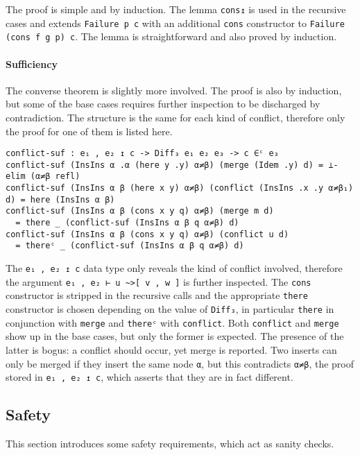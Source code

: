 \documentclass[../Thesis.tex]{subfiles}
\begin{document}
	The proof is simple and by induction. 
	The lemma \texttt{cons↥} is used in the
	recursive cases and extends \texttt{Failure p c} with an additional 
	\texttt{cons} constructor to \texttt{Failure (cons f g p) c}. The lemma
	is straightforward and also proved by induction.

	\paragraph{Sufficiency}
	The converse theorem is slightly more involved.
	The proof is also by induction, but some of the base cases requires further 
	inspection to be discharged by contradiction.
	The structure is the same for each kind of conflict, therefore only the
	proof for one of them is listed here.
	
\begin{verbatim}
conflict-suf : e₁ , e₂ ↥ c -> Diff₃ e₁ e₂ e₃ -> c ∈ᶜ e₃
conflict-suf (InsIns α .α (here y .y) α≠β) (merge (Idem .y) d) = ⊥-elim (α≠β refl)
conflict-suf (InsIns α β (here x y) α≠β) (conflict (InsIns .x .y α≠β₁) d) = here (InsIns α β)
conflict-suf (InsIns α β (cons x y q) α≠β) (merge m d) 
  = there _ (conflict-suf (InsIns α β q α≠β) d)
conflict-suf (InsIns α β (cons x y q) α≠β) (conflict u d) 
  = thereᶜ _ (conflict-suf (InsIns α β q α≠β) d)
\end{verbatim}

The \texttt{e₁ , e₂ ↥ c} data type only reveals the kind of conflict involved,
therefore the argument \texttt{e₁ , e₂ ⊢ u \textasciitilde>[ v , w ]} 
is further inspected.
The \texttt{cons}  constructor is stripped in the recursive 
calls and the appropriate \texttt{there} constructor is chosen depending on 
the value of \texttt{Diff₃}, in particular \texttt{there} in conjunction with 
\texttt{merge} and \texttt{thereᶜ} with \texttt{conflict}.
Both \texttt{conflict} and \texttt{merge} show up in the base cases, but only
the former is expected.
The presence of the latter is bogus: a conflict should occur, yet merge is reported. Two inserts can only be merged if they insert the same node \texttt{α}, but this contradicts \texttt{α≠β}, the proof stored in 
\texttt{e₁ , e₂ ↥ c}, which asserts that they are in fact different.

	\subsection{Safety}
	\label{subsec:Safety}
	This section introduces some safety requirements, which act as sanity
	checks. 
\end{document}
